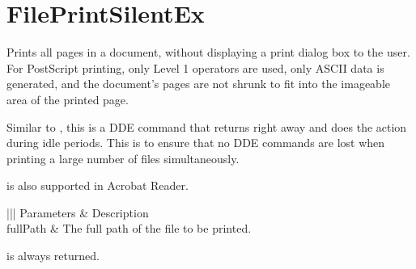 \documentclass[letterpaper,12pt,english,openany,oneside]{sphinxmanual}
\begin{document}
\section{FilePrintSilentEx}
\label{\detokenize{IAC_API_DDE_Messages:id41}}
Prints all pages in a document, without displaying a print dialog box to the user. For PostScript printing, only Level 1 operators are used, only ASCII data is generated, and the document’s pages are not shrunk to fit into the imageable area of the printed page.

Similar to , this is a DDE command that returns  right away and does the action during idle periods. This is to ensure that no DDE commands are lost when printing a large number of files simultaneously.

 is also supported in Acrobat Reader.


\begin{sphinxVerbatim}[commandchars=\\\{\}]
\PYG{p}{[} \PYG{p}{]}
\end{sphinxVerbatim}
\label{\detokenize{IAC_API_DDE_Messages:parameters-23}}


\begin{savenotes}\sphinxattablestart
\centering
{}\label{\detokenize{IAC_API_DDE_Messages:section-23}}\nobreak
\begin{tabular}[t]{|||}
\hline
\sphinxstyletheadfamily 
Parameters
&\sphinxstyletheadfamily 
Description
\\
\hline
fullPath
&
The full path of the file to be printed.
\\
\hline
\end{tabular}
\par
\sphinxattableend\end{savenotes}


 is always returned.
\end{document}
